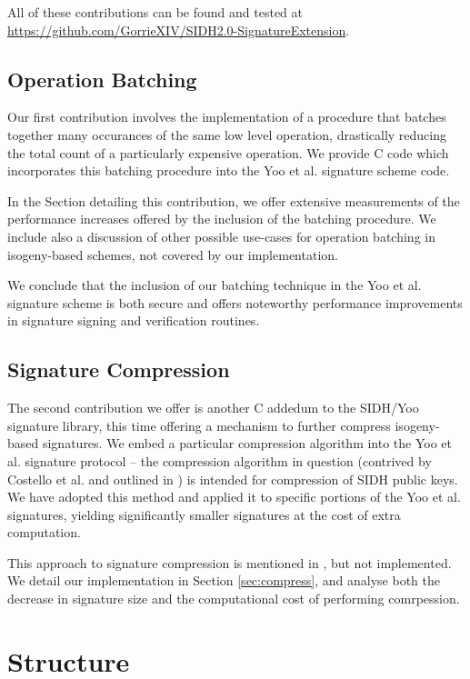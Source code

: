 \noindent
All of these contributions can be found and tested at \url{https://github.com/GorrieXIV/SIDH2.0-SignatureExtension}.

\subsection{Operation Batching}

Our first contribution involves the implementation of a procedure that batches together many occurances of the same low level operation, drastically reducing the total count of a particularly expensive operation. We provide C code which incorporates this batching procedure into the Yoo et al. signature scheme code.

In the Section detailing this contribution, we offer extensive measurements of the performance increases offered by the inclusion of the batching procedure. We include also a discussion of other possible use-cases for operation batching in isogeny-based schemes, not covered by our implementation.

We conclude that the inclusion of our batching technique in the Yoo et al. signature scheme is both secure and offers noteworthy performance improvements in signature signing and verification routines.

\subsection{Signature Compression}

The second contribution we offer is another C addedum to the SIDH/Yoo signature library, this time offering a mechanism to further compress isogeny-based signatures.  We embed a particular compression algorithm into the Yoo et al. signature protocol -- the compression algorithm in question (contrived by Costello et al. and outlined in \cite{pkcomp}) is intended for compression of SIDH public keys. We have adopted this method and applied it to specific portions of the Yoo et al. signatures, yielding significantly smaller signatures at the cost of extra computation.

This approach to signature compression is mentioned in \cite{yoo}, but not implemented. We detail our implementation in Section \ref{sec:compress}, and analyse both the decrease in signature size and the computational cost of performing comrpession. 

\section{Structure}

